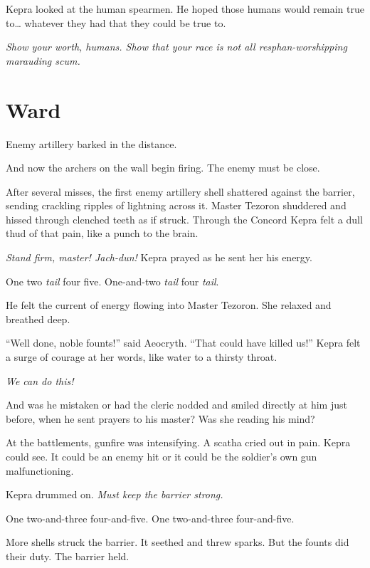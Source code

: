 \documentclass
  [a4paper,
   12pt,
   oneside
  ]%
  {article}
\newcommand{\drum}[1]{\textsf{#1}}
\begin{document}
Kepra looked at the human spearmen. He hoped those humans would remain true to… whatever they had that they could be true to. 

\emph{Show your worth, humans. Show that your race is not all resphan-worshipping marauding scum.}



\section{Ward}
Enemy artillery barked in the distance.

And now the archers on the wall begin firing. The enemy must be close.

After several misses, the first enemy artillery shell shattered against the barrier, sending crackling ripples of lightning across it. Master Tezoron shuddered and hissed through clenched teeth as if struck. Through the Concord Kepra felt a dull thud of that pain, like a punch to the brain. 

\emph{Stand firm, master! Jach-dun!} Kepra prayed as he sent her his energy.

\drum{One two \emph{tail} four five. One-and-two \emph{tail} four \emph{tail}.}

He felt the current of energy flowing into Master Tezoron. She relaxed and breathed deep.

``Well done, noble founts!'' said Aeocryth. ``That could have killed us!'' 
Kepra felt a surge of courage at her words, like water to a thirsty throat. 

\emph{We can do this!}

And was he mistaken or had the cleric nodded and smiled directly at him just before, when he sent prayers to his master? 
Was she reading his mind?

At the battlements, gunfire was intensifying. A scatha cried out in pain. Kepra could see. It could be an enemy hit or it could be the soldier’s own gun malfunctioning.

Kepra drummed on. 
\emph{Must keep the barrier strong.}

\drum{One two-and-three four-and-five. One two-and-three four-and-five.}

More shells struck the barrier. It seethed and threw sparks. But the founts did their duty. The barrier held.
\end{document}
